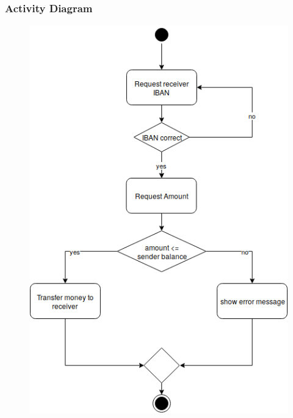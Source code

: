 \documentclass{article}
\begin{document}
		\newpage\subsubsection{Activity Diagram}
		\begin{figure}[h!]
			\begin{center}
				\includegraphics[height=\linewidth]{img/transfer_activity.png}
			\end{center}
		\end{figure}
\end{document}

